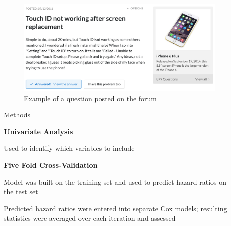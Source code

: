 \documentclass[final]{beamer}
\newlength{\sepwid}
\newlength{\onecolwid}
\begin{document}
\begin{frame}[t]
\begin{columns}[t]
\begin{column}{\onecolwid}
\end{column} %

\begin{column}{\sepwid}\end{column} %

\begin{column}{\onecolwid} %


\begin{figure}
\captionsetup{skip=30pt}
\includegraphics[width=1\linewidth]{question}
\caption{Example of a question posted on the forum}
\label{fig1}
\end{figure}

\vspace{2ex}

\begin{block}{Methods}

\textcolor{dblue!70}{} \textcolor{dblue!70}{\textbf{Univariate Analysis}} 

\vspace{0.5ex}

Used to identify which variables to include

\vspace{1ex}

\textcolor{dblue!70}{} \textcolor{dblue!70}{\textbf{Five Fold Cross-Validation}} 

\vspace{0.5ex}

Model was built on the training set and used to predict hazard ratios on the test set

\vspace{0.5ex}

Predicted hazard ratios were entered into separate Cox models; resulting statistics were averaged over each iteration and assessed



\end{block}
\end{column}
\end{columns}
\end{frame}
\end{document}
